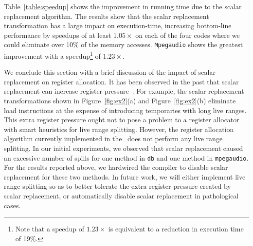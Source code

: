 

Table~\ref{table:speedup} shows the improvement in running time due
to the scalar replacement algorithm.  The results show that the
scalar replacement transformation has a large impact on execution-time,
increasing bottom-line performance by speedups of at least
$1.05\times$ on each of the 
four codes where we could eliminate over 10\% of the memory accesses.
{\tt Mpegaudio} shows the greatest improvement with a 
speedup\footnote{Note that a speedup of $1.23\times$ is equivalent to
a reduction in execution time of 19\%.} of $1.23\times$.

We conclude this section with a brief discussion of the impact of
scalar replacement on register allocation.  It has been observed in
the past that scalar replacement can increase register
pressure~\cite{CaKe94}.  For example, the scalar replacement
transformations shown in Figure~\ref{fig:ex2}(a) and
Figure~\ref{fig:ex2}(b) eliminate load instructions at the expense of
introducing temporaries with long live ranges.  This extra register
pressure ought not to pose a problem to a register allocator with
smart heuristics for live range splitting.  However, the register
allocation algorithm currently implemented in the \joc\ does not
perform any live range splitting.  In our initial experiments, we
observed that scalar replacement caused an excessive number of spills
for one method in {\tt db} and one method in {\tt mpegaudio}.  For the
results reported above, we hardwired the compiler to disable scalar
replacement for these two methods.  In future work, we will either
implement live range splitting so as to better tolerate the extra
register pressure created by scalar replacement, or automatically
disable scalar replacement in pathological cases.

